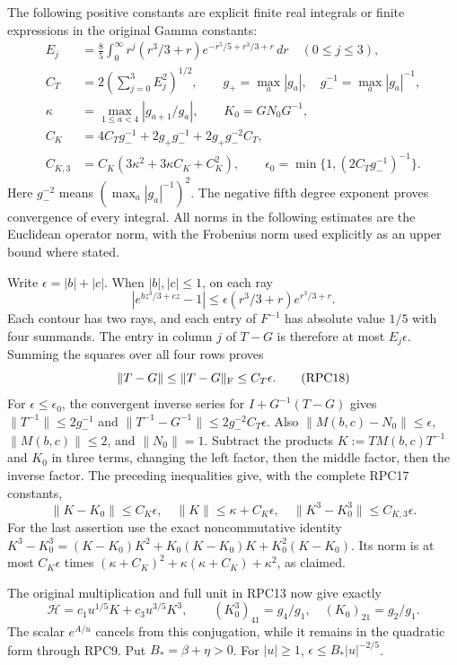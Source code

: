 \documentclass[11pt,a4paper]{article}
\begin{document}
The following positive constants are explicit finite real integrals
or finite expressions in the original Gamma constants:
\[
 \begin{split}
 E_j&=\frac85\int_0^\infty r^j(r^3/3+r)
                    e^{-r^5/5+r^3/3+r}\,dr\quad(0\le j\le3),\\
 C_T&=2\left(\sum_{j=0}^3E_j^2\right)^{1/2},\qquad
 g_+=\max_a|g_a|,\quad g_-^{-1}=\max_a|g_a|^{-1},\\
 \kappa&=\max_{1\le a<4}|g_{a+1}/g_a|,\qquad
 K_0=GN_0G^{-1},\\
 C_K&=4C_Tg_-^{-1}+2g_+g_-^{-1}
                       +2g_+g_-^{-2}C_T,\\
 C_{K,3}&=C_K(3\kappa^2+3\kappa C_K+C_K^2),\qquad
 \epsilon_0=\min\{1,(2C_Tg_-^{-1})^{-1}\}.
 \end{split}
 \tag{RPC17}
\]
Here $g_-^{-2}$ means $(\max_a|g_a|^{-1})^2$. The negative fifth
degree exponent proves convergence of every integral. All norms in
the following estimates are the Euclidean operator norm, with the
Frobenius norm used explicitly as an upper bound where stated.

Write $\epsilon=|b|+|c|$. When $|b|,|c|\le1$, on each ray
\[
 |e^{bz^3/3+cz}-1|
 \le \epsilon(r^3/3+r)e^{r^3/3+r}.
\]
Each contour has two rays, and each entry of $F^{-1}$ has absolute
value $1/5$ with four summands. The entry in column $j$ of
$T-G$ is therefore at most $E_j\epsilon$. Summing the squares
over all four rows proves
\[
 \|T-G\|\le\|T-G\|_{\rm F}\le C_T\epsilon.
 \tag{RPC18}
\]
For $\epsilon\le\epsilon_0$, the convergent inverse series for
$I+G^{-1}(T-G)$ gives
$\|T^{-1}\|\le2g_-^{-1}$ and
$\|T^{-1}-G^{-1}\|\le2g_-^{-2}C_T\epsilon$.
Also $\|M(b,c)-N_0\|\le\epsilon$, $\|M(b,c)\|\le2$,
and $\|N_0\|=1$. Subtract the products
$K:=T M(b,c)T^{-1}$ and $K_0$ in three terms, changing the left
factor, then the middle factor, then the inverse factor. The preceding
inequalities give, with the complete RPC17 constants,
\[
 \|K-K_0\|\le C_K\epsilon,\quad
 \|K\|\le\kappa+C_K\epsilon,\quad
 \|K^3-K_0^3\|\le C_{K,3}\epsilon.
 \tag{RPC19}
\]
For the last assertion use the exact noncommutative identity
$K^3-K_0^3=(K-K_0)K^2+K_0(K-K_0)K+K_0^2(K-K_0)$.
Its norm is at most $C_K\epsilon$ times
$(\kappa+C_K)^2+\kappa(\kappa+C_K)+\kappa^2$, as claimed.

The original multiplication and full unit in RPC13 now give exactly
\[
 \mathcal H=c_1u^{1/5}K+c_3u^{3/5}K^3,
 \qquad (K_0^3)_{41}=g_4/g_1,\quad (K_0)_{21}=g_2/g_1.
 \tag{RPC20}
\]
The scalar $e^{A/u}$ cancels from this conjugation, while it remains
in the quadratic form through RPC9. Put $B_*=\beta+\eta>0$.
For $|u|\ge1$, $\epsilon\le B_*|u|^{-2/5}$.
\end{document}
